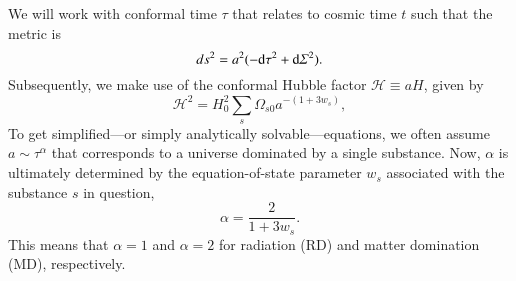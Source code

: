 









We will work with conformal time $\tau$ that relates to cosmic time $t$ such that the metric is%
\begin{equation}
    {ds}^2 = a^2 (-{\diff \tau}^2+ {\diff \varSigma}^2).
\end{equation}
Subsequently, we make use of the conformal Hubble factor $\mathcal{H}\equiv a H$, given by
\begin{equation}\label{eq:GR:lcdm:first_Friedmann_conformal}
    \mathcal{H}^2 = H_0^2 \sum_s \Omega_{s0} a^{-(1+3w_s)},
\end{equation}
To get simplified---or simply analytically solvable---equations, we often assume $a\sim \tau^\alpha$ that corresponds to a universe dominated by a single substance. Now, $\alpha$ is ultimately determined by the equation-of-state parameter $w_s$ associated with the substance $s$ in question, 
\begin{equation}
    \alpha = \frac{2}{1+3w_s}.
\end{equation}
This means that $\alpha=1$ and $\alpha=2$ for radiation (RD) and matter domination (MD), respectively. %

